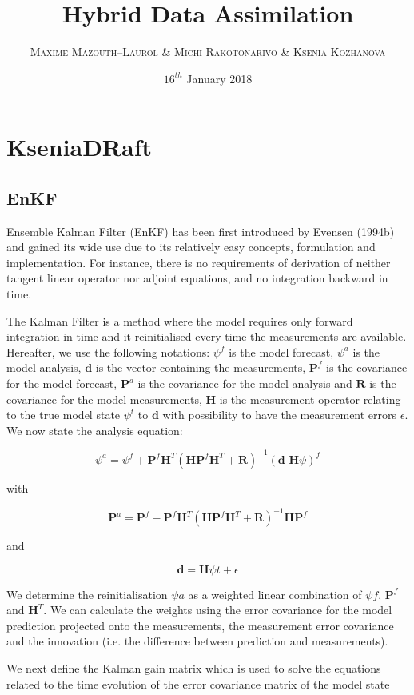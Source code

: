 \documentclass[a4,12pt]{article}
\title{\textbf{Hybrid Data Assimilation}}
\author{
\begin{tabular}{cc}
	\textsc{Maxime Mazouth--Laurol} \& \textsc{Michi Rakotonarivo} \& \textsc{Ksenia Kozhanova}
\end{tabular}}
\date{\small $16^{th}$ January 2018}
\numberwithin{equation}{section}
\begin{document}
\maketitle

\section{KseniaDRaft}
\subsection{EnKF}
Ensemble Kalman Filter (EnKF) has been first introduced by Evensen (1994b) and gained its wide use due to its relatively easy concepts, formulation and implementation. For instance, there is no requirements of derivation of neither tangent linear operator nor adjoint equations, and no integration backward in time.

The Kalman Filter is a method where the model requires only forward integration in time and it reinitialised every time the measurements are available. Hereafter, we use the following notations: $\psi^{f}$ is the model forecast, $\psi^{a}$ is the model analysis, $\textbf{d}$ is the vector containing the measurements, $\textbf{P}^{f}$ is the covariance for the model forecast, $\textbf{P}^{a}$ is the covariance for the model analysis and $\textbf{R}$ is the covariance for the model measurements, $\textbf{H}$ is the measurement operator relating to the true model state $\psi ^{t}$ to $\textbf{d}$ with possibility to have the measurement errors $\epsilon$. We now state the analysis equation:

$$\psi ^{a} = \psi ^{f} + \textbf{P} ^{f}\textbf{H} ^{T}(\textbf{HP} ^{f}\textbf{H} ^{T}+\textbf{R}) ^{-1}(\textbf{d-H}\psi) ^{f}$$

with

$$\textbf{P}^{a} = \textbf{P}^{f} - \textbf{P}^{f}\textbf{H}^{T}(\textbf{HP}^{f}\textbf{H}^{T}+\textbf{R})^{-1}\textbf{HP}^{f} $$

and 

$$\textbf{d} = \textbf{H}\psi{t} + \epsilon$$

We determine the reinitialisation $\psi{a}$ as a weighted linear combination of $\psi{f}$, $\textbf{P}^{f}$ and $\textbf{H}^{T}$. We can calculate the weights using the error covariance for the model prediction projected onto the measurements, the measurement error covariance and the innovation (i.e. the difference between prediction and measurements).     

We next define the Kalman gain matrix which is used to solve the equations related to the time evolution of the error covariance matrix of the model state
\end{document}
